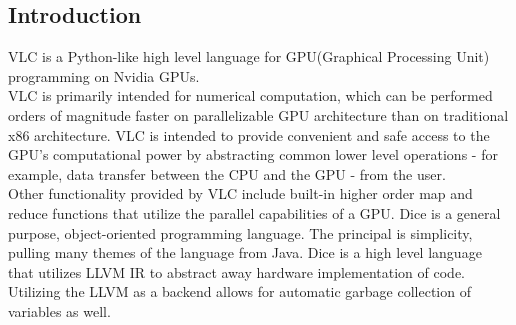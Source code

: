 \begin{homeworkProblem}
	\section{Introduction}
VLC is a Python-like high level language for GPU(Graphical Processing Unit) programming on Nvidia GPUs.\\

VLC is primarily intended for numerical computation, which can be performed orders of magnitude faster on parallelizable GPU architecture than on traditional x86 architecture. VLC is intended to provide convenient and safe access to the GPU’s computational power by abstracting common lower level operations - for example, data transfer between the CPU and the GPU - from the user.\\

Other functionality provided by VLC include built-in higher order map and reduce functions that utilize the parallel capabilities of a GPU.	Dice is a general purpose, object-oriented programming language. The principal is simplicity, pulling many themes of the language from Java. Dice is a high level language that utilizes LLVM IR to abstract away hardware implementation of code. Utilizing the LLVM as a backend allows for automatic garbage collection of variables as well.
\end{homeworkProblem}